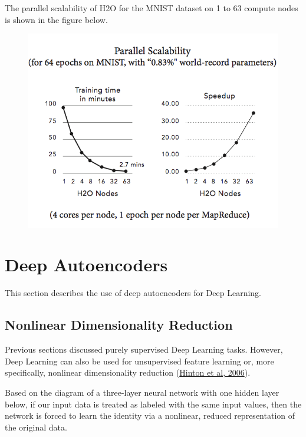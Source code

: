 {{The parallel scalability of H2O for the MNIST dataset on 1 to 63 compute nodes is shown in the figure below.
\begin{figure}[h!]
\centering
\includegraphics[scale=0.6]{scalability_new.png}
\end{figure}

\newpage
\section{Deep Autoencoders}
\label{sec:DeepAutoencoders}  
This section describes the use of deep autoencoders for Deep Learning. 
\subsection{Nonlinear Dimensionality Reduction} 
Previous sections discussed purely supervised Deep Learning tasks. However, Deep Learning can also be used for unsupervised feature learning or, more specifically, nonlinear dimensionality reduction  (\href{http://www.cs.toronto.edu/~hinton/science.pdf}{Hinton et al, 2006}). 

Based on the diagram of a three-layer neural network with one hidden layer below, if our input data is treated as labeled with the same input values, then the network is forced to learn the identity via a nonlinear, reduced representation of the original data. 

}}
